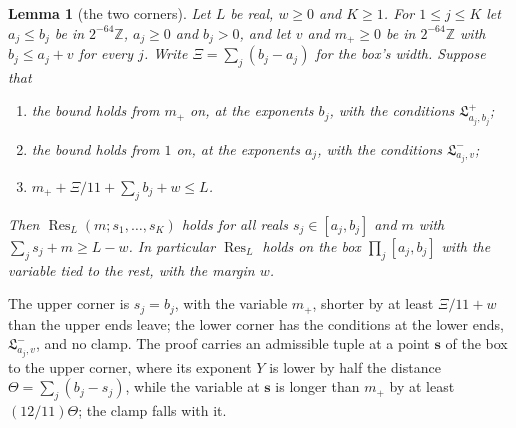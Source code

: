 \documentclass[11pt]{article}
\newtheorem{lemma}[theorem]{Lemma}
\theoremstyle{definition}
\begin{document}
\begin{lemma}[the two corners]\label{lem:two-corners}
Let $L$ be real, $w \ge 0$ and $K \ge 1$. For $1 \le j \le K$ let $a_j \le b_j$ be in $2^{-64}\mathbb Z$, $a_j \ge 0$
and
$b_j > 0$, and let $v$ and $m_+ \ge 0$ be in $2^{-64}\mathbb Z$ with $b_j \le a_j + v$ for every $j$. Write $\Xi =
\sum_j (b_j - a_j)$ for the box's width. Suppose that
\begin{enumerate}
\item[(U)] the bound holds from $m_+$ on, at the exponents $b_j$, with the conditions $\mathfrak L^+_{a_j, b_j}$;
\item[(Lo)] the bound holds from $1$ on, at the exponents $a_j$, with the conditions $\mathfrak L^-_{a_j, v}$;
\item[(Rm)] $m_+ + \Xi/11 + \sum_j b_j + w \le L$.
\end{enumerate}
Then $\operatorname{Res}_L(m; s_1, \dots, s_K)$ holds for all reals $s_j \in [a_j, b_j]$ and $m$ with $\sum_j s_j + m
\ge
L - w$. In particular $\operatorname{Res}_L$ holds on the box $\prod_j [a_j, b_j]$ with the variable tied to the rest,
with the margin $w$.
\end{lemma}

The upper corner is $s_j = b_j$, with the variable $m_+$, shorter by at least $\Xi/11 + w$ than the upper ends leave;
the
lower corner has the conditions at the lower ends, $\mathfrak L^-_{a_j, v}$, and no clamp. The proof carries an
admissible tuple at a point $\mathbf s$
of the box to the upper corner, where its exponent $Y$ is lower by half the distance $\Theta = \sum_j (b_j - s_j)$, while
the variable at
$\mathbf s$ is longer than $m_+$ by at least $(12/11)\Theta$; the clamp falls with it.
\end{document}
